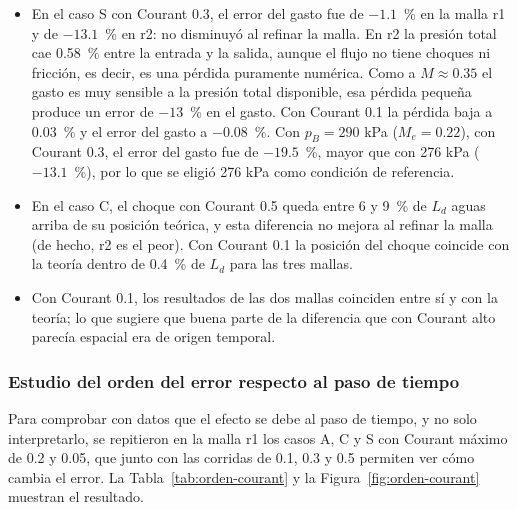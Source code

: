 \documentclass[12pt,letterpaper]{article}
\numberwithin{equation}{section}
\begin{document}
\begin{itemize}
  \item En el caso S con Courant 0.3, el error del gasto fue de $-1.1$~\% en la malla r1 y de $-13.1$~\% en r2: no disminuyó al refinar la malla. En r2 la presión total cae 0.58~\% entre la entrada y la salida, aunque el flujo no tiene choques ni fricción, es decir, es una pérdida puramente numérica. Como a $M\approx0.35$ el gasto es muy sensible a la presión total disponible, esa pérdida pequeña produce un error de $-13$~\% en el gasto. Con Courant 0.1 la pérdida baja a 0.03~\% y el error del gasto a $-0.08$~\%. Con $p_B=290$ kPa ($M_e=0.22$), con Courant 0.3, el error del gasto fue de $-19.5$~\%, mayor que con 276 kPa ($-13.1$~\%), por lo que se eligió 276 kPa como condición de referencia.
  \item En el caso C, el choque con Courant 0.5 queda entre 6 y 9~\% de $L_d$ aguas arriba de su posición teórica, y esta diferencia no mejora al refinar la malla (de hecho, r2 es el peor). Con Courant 0.1 la posición del choque coincide con la teoría dentro de 0.4~\% de $L_d$ para las tres mallas.
  \item Con Courant 0.1, los resultados de las dos mallas coinciden entre sí y con la teoría; lo que sugiere que buena parte de la diferencia que con Courant alto parecía espacial era de origen temporal.
\end{itemize}

\subsubsection*{Estudio del orden del error respecto al paso de tiempo}

Para comprobar con datos que el efecto se debe al paso de tiempo, y no solo interpretarlo, se repitieron en la malla r1 los casos A, C y S con Courant máximo de 0.2 y 0.05, que junto con las corridas de 0.1, 0.3 y 0.5 permiten ver cómo cambia el error. La Tabla~\ref{tab:orden-courant} y la Figura~\ref{fig:orden-courant} muestran el resultado.
\end{document}
